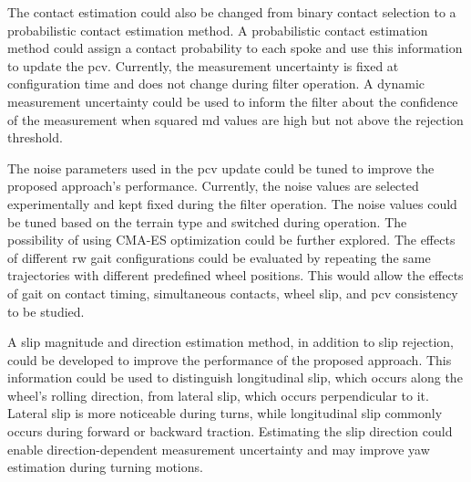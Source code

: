 \documentclass[report.tex]{subfiles}
\begin{document}
    The contact estimation could also be changed from binary contact selection to a probabilistic contact estimation method. A probabilistic contact estimation method could assign a contact probability to each spoke and use this information to update the \gls{pcv}. Currently, the measurement uncertainty is fixed at configuration time and does not change during filter operation. A dynamic measurement uncertainty could be used to inform the filter about the confidence of the measurement when squared \gls{md} values are high but not above the rejection threshold. 
    
    The noise parameters used in the \gls{pcv} update could be tuned to improve the proposed approach's performance. Currently, the noise values are selected experimentally and kept fixed during the filter operation. The noise values could be tuned based on the terrain type and switched during operation. The possibility of using CMA-ES optimization could be further explored. The effects of different \gls{rw} gait configurations could be evaluated by repeating the same trajectories with different predefined wheel positions. This would allow the effects of gait on contact timing, simultaneous contacts, wheel slip, and \gls{pcv} consistency to be studied.

    A slip magnitude and direction estimation method, in addition to slip rejection, could be developed to improve the performance of the proposed approach. This information could be used to distinguish longitudinal slip, which occurs along the wheel's rolling direction, from lateral slip, which occurs perpendicular to it. Lateral slip is more noticeable during turns, while longitudinal slip commonly occurs during forward or backward traction. Estimating the slip direction could enable direction-dependent measurement uncertainty and may improve yaw estimation during turning motions.
\end{document}
